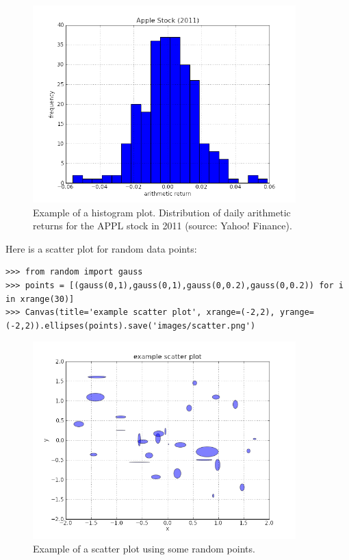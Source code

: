 \documentclass[justified,sixbynine]{tufte-book}
\def\ft{\small\tt}
\theoremstyle{plain}%
\theoremstyle{definition}
\theoremstyle{remark}
\begin{document}
\begin{fullwidth}
\begin{figure}[ht]
\centering\includegraphics[width=4in]{images/aapl2011hist.png}
\caption{Example of a histogram plot. Distribution of daily arithmetic returns for the APPL stock in 2011 (source: Yahoo! Finance).}
\end{figure}

Here is a scatter plot for random data points:

\begin{lstlisting}[caption={in file: {\ft nlib.py}}]
>>> from random import gauss
>>> points = [(gauss(0,1),gauss(0,1),gauss(0,0.2),gauss(0,0.2)) for i in xrange(30)]
>>> Canvas(title='example scatter plot', xrange=(-2,2), yrange=(-2,2)).ellipses(points).save('images/scatter.png')
\end{lstlisting}

\begin{figure}[ht]
\centering\includegraphics[width=4in]{images/scatter.png}
\caption{Example of a scatter plot using some random points.}
\end{figure}


\end{fullwidth}
\end{document}
